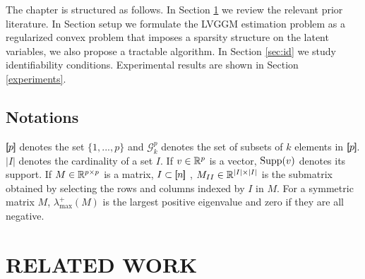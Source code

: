 \documentclass[letterpaper]{article}
\begin{document}
The chapter is structured as follows. In Section \ref{related} we review the relevant prior literature. In Section {setup} we formulate the LVGGM estimation problem as a regularized convex problem that imposes a sparsity structure on the latent variables, we also propose a tractable algorithm. In Section \ref{sec:id} we study identifiability conditions. Experimental results are shown in Section \ref{experiments}.

\subsection*{Notations}
$[\!\![p]\!\!]$ denotes the set $\{1,...,p\}$ and $\mathcal{G}^p_k$ denotes the
set of subsets of $k$ elements in $[\!\![p]\!\!]$. $|I|$ denotes the cardinality of a set $I$. If $v\in\mathbb{R}^{p}$ is a vector, ${\rm Supp}(v)$ denotes its support. If $M\in\mathbb{R}^{p\times p}$ is a matrix, $I\subset[\!\![n]\!\!]$ , $M_{II}\in\mathbb{R}^{|I|\times |I|}$ is the submatrix obtained by selecting the rows and columns indexed by $I$ in $M$. For a symmetric matrix $M$, $\lambda_{\max}^+(M)$ is the largest positive eigenvalue and zero if they are all negative.

%

\section{RELATED WORK}
\label{related}
\end{document}

